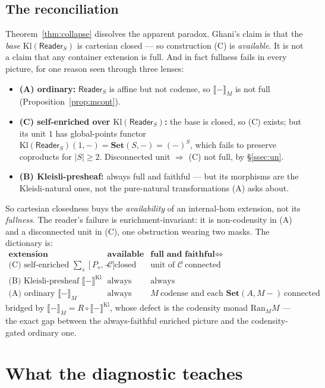 \documentclass[11pt]{amsart}
\theoremstyle{plain}
\theoremstyle{definition}
\theoremstyle{remark}
\newcommand{\Set}{\mathbf{Set}}
\newcommand{\Kl}{\mathrm{Kl}}
\newcommand{\Ran}{\mathrm{Ran}}
\newcommand{\extM}[1]{\llbracket #1 \rrbracket_{M}}
\newcommand{\extKl}[1]{\llbracket #1 \rrbracket^{\Kl}}
\newcommand{\Reader}{\mathsf{Reader}}
\newcommand{\C}{\mathcal{C}}
\begin{document}
\subsection{The reconciliation}\label{ssec:reconcile}
Theorem~\ref{thm:collapse} dissolves the apparent paradox. Ghani's claim is that the \emph{base}
$\Kl(\Reader_S)$ is cartesian closed --- so construction (C) is \emph{available}. It is not a claim
that any container extension is full. And in fact fullness fails in every picture, for one reason seen
through three lenses:
\begin{itemize}[leftmargin=1.8em]
  \item \textbf{(A) ordinary:} $\Reader_S$ is affine but not codense, so $\extM{-}$ is not full
    (Proposition~\ref{prop:mcont}).
  \item \textbf{(C) self-enriched over $\Kl(\Reader_S)$:} the base is closed, so (C) exists; but its
    unit $1$ has global-points functor $\Kl(\Reader_S)(1,-)=\Set(S,-)=(-)^S$, which fails to preserve
    coproducts for $|S|\ge2$. Disconnected unit $\Rightarrow$ (C) not full, by \S\ref{ssec:un}.
  \item \textbf{(B) Kleisli-presheaf:} always full and faithful --- but its morphisms are the
    Kleisli-natural ones, not the pure-natural transformations (A) asks about.
\end{itemize}
So cartesian closedness buys the \emph{availability} of an internal-hom extension, not its
\emph{fullness}. The reader's failure is enrichment-invariant: it is non-codensity in (A) and a
disconnected unit in (C), one obstruction wearing two masks. The dictionary is:
\[
  \begin{array}{lll}
    \textbf{extension} & \textbf{available} & \textbf{full and faithful} \iff\\[2pt]
    \text{(C) self-enriched }\sum_s[P_s,-] & \C\ \text{closed} & \text{unit of }\C\ \text{connected}\\
    \text{(B) Kleisli-presheaf }\extKl{-} & \text{always} & \text{always}\\
    \text{(A) ordinary }\extM{-} & \text{always} & M\ \text{codense and each }\Set(A,M-)\ \text{connected}
  \end{array}
\]
bridged by $\extM{-}=R\circ\extKl{-}$, whose defect is the codensity monad $\Ran_M M$ --- the exact
gap between the always-faithful enriched picture and the codensity-gated ordinary one.

\section{What the diagnostic teaches}\label{sec:conclusion}
\end{document}
